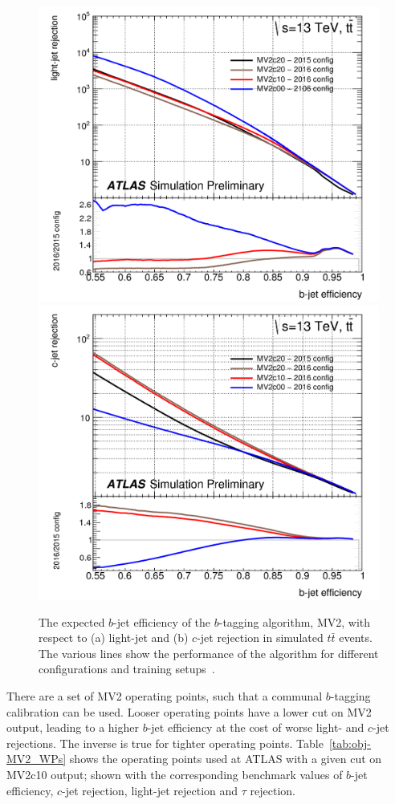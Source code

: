 \begin{figure}[!ht]
  \begin{center}
    \captionsetup[subfigure]{aboveskip=0pt,justification=centering}
     {\includegraphics[width=0.48\linewidth, angle=0]{figs/Objects/bjets_perf_light}}
      { \includegraphics[width=0.48\linewidth, angle=0]{figs/Objects/bjets_perf_charm}}
  \end{center}
  \caption[The expected $b$-jet efficiency of the $b$-tagging algorithm, MV2, with respect to
    light-jet and $c$-jet rejection in simulated $t\bar{t}$ events.]
    {The expected $b$-jet efficiency of the $b$-tagging algorithm, MV2, with respect to
    (a) light-jet and (b) $c$-jet rejection in simulated $t\bar{t}$ events.
    The various lines show the performance of the algorithm for different configurations and training setups~\cite{obj-bjets_algo_2016}.}
  \label{fig:obj-bjets_perf}
\end{figure}

There are a set of MV2 operating points, such that a communal $b$-tagging calibration can be used.
Looser operating points have a lower cut on MV2 output, leading to a higher $b$-jet efficiency at the cost of worse light- and $c$-jet rejections.
The inverse is true for tighter operating points.
Table~\ref{tab:obj-MV2_WPs} shows the operating points used at ATLAS with a given cut on MV2c10 output;
shown with the corresponding benchmark values of $b$-jet efficiency, $c$-jet rejection, light-jet rejection and $\tau$ rejection.

